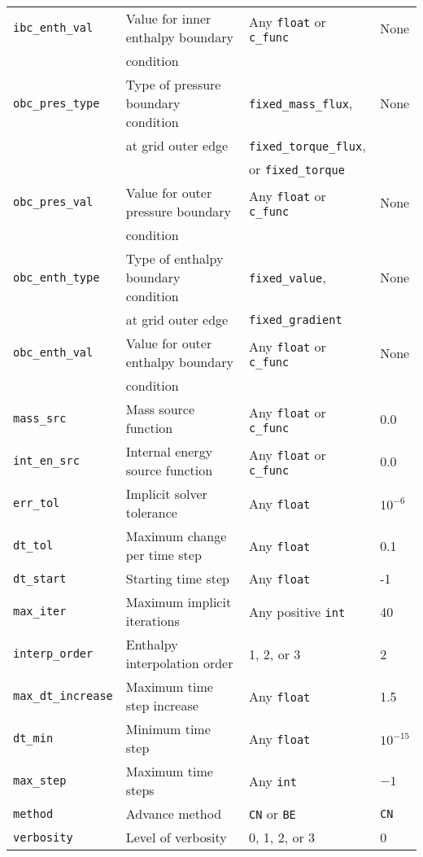 \documentclass[12pt]{article}
\begin{document}
\begin{table}
\begin{center}
\begin{tabular}{|l|l|l|l|}
\verb=ibc_enth_val= & Value for inner enthalpy boundary & Any \texttt{float} or \verb=c_func= & None \\
& condition & & \\ \hline
\verb=obc_pres_type= & Type of pressure boundary condition & \verb=fixed_mass_flux=, & None \\
& at grid outer edge& \verb=fixed_torque_flux=, & \\
& & or \verb=fixed_torque= & \\ \hline
\verb=obc_pres_val= & Value for outer pressure boundary & Any \texttt{float} or \verb=c_func= & None \\
& condition & & \\ \hline
\verb=obc_enth_type= & Type of enthalpy boundary condition & \verb=fixed_value=, & None \\
& at grid outer edge & \verb=fixed_gradient= & \\ \hline
\verb=obc_enth_val= & Value for outer enthalpy boundary & Any \texttt{float} or \verb=c_func= & None \\
& condition & & \\ \hline
\verb=mass_src= & Mass source function & Any \texttt{float} or \verb=c_func= & 0.0 \\ \hline
\verb=int_en_src= & Internal energy source function & Any \texttt{float} or \verb=c_func= & 0.0 \\ \hline
\verb=err_tol= & Implicit solver tolerance & Any \texttt{float} & $10^{-6}$ \\ \hline
\verb=dt_tol= & Maximum change per time step & Any \texttt{float} & 0.1 \\ \hline
\verb=dt_start= & Starting time step & Any \texttt{float} & -1 \\ \hline
\verb=max_iter= & Maximum implicit iterations & Any positive \texttt{int} & 40 \\ \hline
\verb=interp_order= & Enthalpy interpolation order & 1, 2, or 3 & 2 \\ \hline
\verb=max_dt_increase= & Maximum time step increase & Any \texttt{float} & 1.5 \\ \hline
\verb=dt_min= & Minimum time step  & Any \texttt{float} & $10^{-15}$ \\ \hline
\verb=max_step= & Maximum time steps & Any \texttt{int} & $-1$ \\ \hline
\verb=method= & Advance method & \verb=CN= or \verb=BE= & \verb=CN= \\ \hline
\verb=verbosity= & Level of verbosity & 0, 1, 2, or 3 & 0 \\ \hline

\end{tabular}
\end{center}
\end{table}
\end{document}
